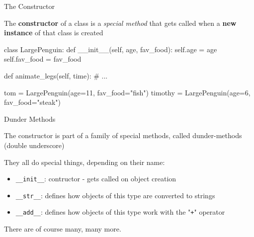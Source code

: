 \begin{frame}[fragile]{The Constructor}

    \begin{block}{}
        The {\bf constructor} of a class is a \textit{special method} that gets called when a \textbf{new instance} of that class is created
    \end{block}

    \begin{pythoncode}
class LargePenguin:
    def __init__(self, age, fav_food):
        self.age = age
        self.fav_food = fav_food

    def animate_legs(self, time):
        # ...

tom = LargePenguin(age=11, fav_food="fish")
timothy = LargePenguin(age=6, fav_food="steak")
    \end{pythoncode}


\end{frame}

\begin{frame}{Dunder Methods}

    The constructor is part of a family of special methods, called dunder-methods (double underscore)

    \vspace{1em}

    They all do special things, depending on their name:
    \begin{itemize}
        \item {\tt \_\_init\_\_}: contructor - gets called on object creation
        \item {\tt \_\_str\_\_}: defines how objects of this type are converted to strings
        \item {\tt \_\_add\_\_}: defines how objects of this type work with the "{\tt +}" operator
    \end{itemize}

    \vspace{1em}

    There are of course many, many more.


\end{frame}

